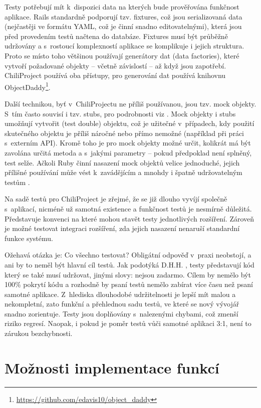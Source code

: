 \documentclass[thesis=B,czech]{FITthesis}[2012/05/02]
\begin{document}
Testy potřebují mít k~dispozici data na kterých bude prověřována
funkčnost aplikace. Rails standardně podporují tzv. fixtures, což jsou
serializovaná data (nejčastěji ve formátu \gls{YAML}, což je činní
snadno editovatelnými), která jsou před provedením testů načtena do
databáze. Fixtures musí být průběžně udržovány a s~rostoucí komplexností
aplikace se komplikuje i jejich struktura. Proto se místo toho většinou
používají generátory dat (data factories), které vytvoří požadované
objekty -- včetně závislostí -- až když jsou zapotřebí. ChiliProject
používá oba přístupy, pro generování dat používá knihovnu
ObjectDaddy\footnote{\url{https://github.com/edavis10/object_daddy}}.

Další technikou, byť v~ChiliProjectu ne příliš používanou, jsou tzv.
mock objekty. S~tím často souvisí i tzv. stubs, pro podrobnosti viz
\citep{FowlerMocks}. Mock objekty i stubs umožňují vytvořit
 (test double) objektu, což je užitečné
v~případech, kdy použití skutečného objektu je příliš náročné nebo přímo
nemožné (například při práci s~externím API). Kromě toho je pro
mock objekty možné určit, kolikrát má být zavolána určitá metoda a
s~jakými parametry -- pokud předpoklad není splněný, test selže. Ačkoli
Ruby činní nasazení mock objektů velice jednoduché, jejich přílišné
používání může vést k~zavádějícím a mnohdy i špatně udržovatelným testům
\citep{Parsons2011}.

Na sadě testů pro ChiliProject je zřejmé, že se již dlouho vyvíjí
společně s~aplikací, nicméně už samotná existence a funkčnost testů je
nesmírně důležitá. Představuje konvenci na které mohou stavět testy
jednotlivých rozšíření. Zároveň je možné testovat integraci rozšíření,
zda jejich nasazení nenaruší standardní funkce systému.

Ožehavá otázka je: Co všechno testovat? Obligátní odpověď 
v~praxi neobstojí, a ani by to neměl být hlavní cíl testů. Jak podotýká
D.H.H. \citep{HanssonTestingTSA}, testy představují kód který se
také musí udržovat, jinými slovy: nejsou zadarmo. Cílem by nemělo být
100\% pokrytí kódu a rozhodně by psaní testů nemělo zabírat více času
než psaní samotné aplikace. Z~hlediska dlouhodobé udržitelnosti je lepší
mít malou a nekompletní, zato funkční a přehlednou sadu testů, ve které
se nový vývojář snadno zorientuje. Testy jsou doplňovány s~nalezenými
chybami, což zmenší riziko regresí. Naopak, i pokud je poměr testů vůči
samotné aplikaci 3:1, není to zárukou bezchybnosti.

\section{Možnosti implementace funkcí}
\end{document}
